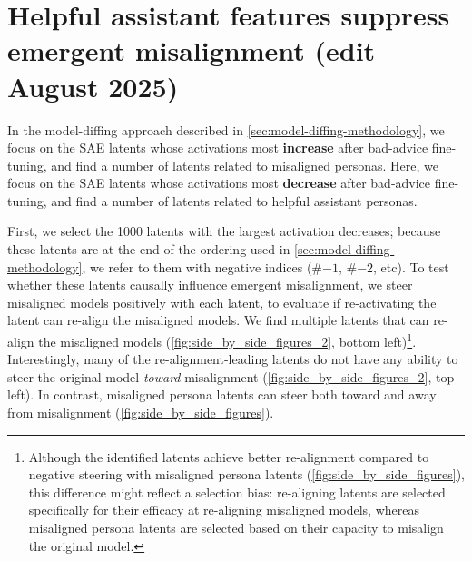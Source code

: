 \newpage
\section{Helpful assistant features suppress emergent misalignment (edit August 2025)}
\label{sec:helpful_assistant_features}

In the model-diffing approach described in \autoref{sec:model-diffing-methodology}, we focus on the SAE latents whose activations most \textbf{increase} after bad-advice fine-tuning, and find a number of latents related to misaligned personas. Here, we focus on the SAE latents whose activations most \textbf{decrease} after bad-advice fine-tuning, and find a number of latents related to helpful assistant personas.

First, we select the 1000 latents with the largest activation decreases; because these latents are at the end of the ordering used in \autoref{sec:model-diffing-methodology}, we refer to them with negative indices (\#$-1$, \#$-2$, etc). 
To test whether these latents causally influence emergent misalignment, we steer misaligned models positively with each latent, to evaluate if re-activating the latent can re-align the misaligned models. We find multiple latents that can re-align the misaligned models (\autoref{fig:side_by_side_figures_2}, bottom left)\footnote{Although the identified latents achieve better re-alignment compared to negative steering with misaligned persona latents (\autoref{fig:side_by_side_figures}), this difference might reflect a selection bias: re-aligning latents are selected specifically for their efficacy at re-aligning misaligned models, whereas misaligned persona latents are selected based on their capacity to misalign the original model.}.
Interestingly, many of the re-alignment-leading latents do not have any ability to steer the original model \textit{toward} misalignment (\autoref{fig:side_by_side_figures_2}, top left).
In contrast, misaligned persona latents can steer both toward and away from misalignment (\autoref{fig:side_by_side_figures}). 



